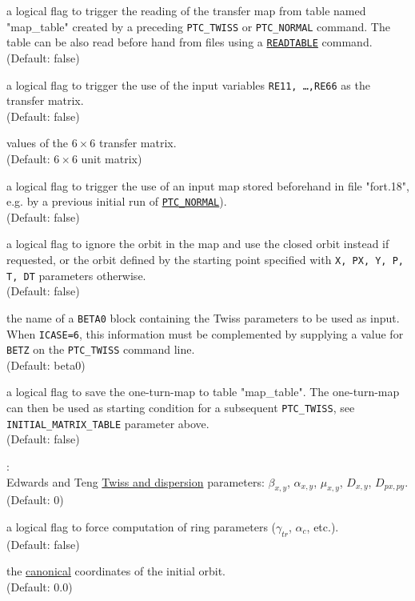 \begin{madlist}
  a logical flag to trigger the reading of the transfer map from table
  named "map\_table" created by a preceding \texttt{PTC\_TWISS} or
  \texttt{PTC\_NORMAL} command. The table can be also read 
  before hand from files using a \hyperref[sec:readtable]{\texttt{READTABLE}}
  command.\\ 
  (Default: false)
  
  a logical flag to trigger the use of the input variables \texttt{RE11,
    \ldots ,RE66} as the transfer matrix. \\
  (Default: false)

  values of the $6\times 6$ transfer matrix. \\ 
  (Default: $6\times 6$ unit matrix) 
  
  a logical flag to trigger the use of an input map stored beforehand in
  file "fort.18",  e.g. by a previous initial run of
  \hyperref[chap:ptc-normal]{\texttt{PTC\_NORMAL}}). \\
  (Default: false)

  a logical flag to ignore the orbit in the map and use the closed orbit
  instead if requested, or the orbit defined by the starting point
  specified with \texttt{X, PX, Y, P, T, DT} parameters otherwise. \\
  (Default: false)

  the name of a \texttt{BETA0} block containing the Twiss
  parameters to be used as input. When \texttt{ICASE=6}, this information
  must be complemented by supplying a value for \texttt{BETZ} on the
  \texttt{PTC\_TWISS} command line. \\
  (Default: beta0)

  a logical flag to save the one-turn-map to table
  "map\_table". The one-turn-map can then be used as starting condition
  for a subsequent \texttt{PTC\_TWISS}, see \texttt{INITIAL\_MATRIX\_TABLE}
  parameter above. \\ (Default: false)

   : \\
  Edwards and Teng \cite{edwards1973} 
  \hyperref[chap:twiss]{Twiss and dispersion} parameters:  
  $\beta_{x,y}$, $\alpha_{x,y}$, $\mu_{x,y}$, $D_{x,y}$, $D_{px,py}$.\\
  (Default: 0) 

   a logical flag to force computation of ring
  parameters ($\gamma_{tr}$, $\alpha_c$, etc.). \\ 
  (Default: false)

   the
  \hyperref[subsec:tables-canon]{canonical} coordinates of the initial
  orbit. \\ (Default: 0.0) \\
  
\end{madlist}


